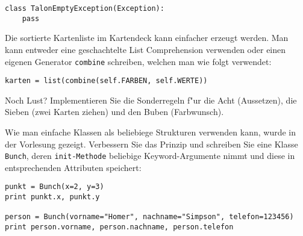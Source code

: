 \begin{aufgabe}[MauMau]
\begin{teilaufgabe}[Grundlagen]
\begin{lstlisting}
class TalonEmptyException(Exception):
    pass
\end{lstlisting}
\end{teilaufgabe}
\begin{teilaufgabe}[F"ur Profis]
Die sortierte Kartenliste im Kartendeck kann einfacher erzeugt werden. Man kann entweder eine geschachtelte List Comprehension verwenden oder einen eigenen Generator \lstinline{combine} schreiben, welchen man wie folgt verwendet:
\begin{lstlisting}
karten = list(combine(self.FARBEN, self.WERTE))
\end{lstlisting}
\end{teilaufgabe}
\begin{teilaufgabe}[Spezialkarten]
Noch Lust? Implementieren Sie die Sonderregeln f"ur die Acht (Aussetzen), die Sieben (zwei Karten ziehen) und den Buben (Farbwunsch).
\end{teilaufgabe}
\end{aufgabe}

\begin{aufgabe}[F"ur Profis]
Wie man einfache Klassen als beliebiege Strukturen verwenden kann, wurde in der Vorlesung gezeigt. Verbessern Sie das Prinzip und schreiben Sie eine Klasse \lstinline{Bunch}, deren \lstinline{init-Methode} beliebige Keyword-Argumente nimmt und diese in entsprechenden Attributen speichert:
\begin{lstlisting}
punkt = Bunch(x=2, y=3)
print punkt.x, punkt.y

person = Bunch(vorname="Homer", nachname="Simpson", telefon=123456)
print person.vorname, person.nachname, person.telefon
\end{lstlisting}
\end{aufgabe}


